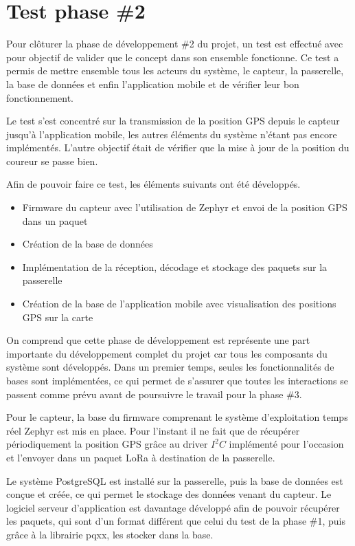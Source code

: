
\chapter{Test phase \#2}\label{ch:test_2}

Pour clôturer la phase de développement \#2 du projet, un test est effectué avec pour objectif de valider que le concept dans son ensemble fonctionne. Ce test a permis de mettre ensemble tous les acteurs du système, le capteur, la passerelle, la base de données et enfin l'application mobile et de vérifier leur bon fonctionnement.

Le test s'est concentré sur la transmission de la position GPS depuis le capteur jusqu'à l'application mobile, les autres éléments du système n'étant pas encore implémentés. L’autre objectif était de vérifier que la mise à jour de la position du coureur se passe bien.

Afin de pouvoir faire ce test, les éléments suivants ont été développés.

\begin{itemize}
\item Firmware du capteur avec l'utilisation de Zephyr et envoi de la position GPS dans un paquet
\item Création de la base de données
\item Implémentation de la réception, décodage et stockage des paquets sur la passerelle
\item Création de la base de l'application mobile avec visualisation des positions GPS sur la carte
\end{itemize}

On comprend que cette phase de développement est représente une part importante du développement complet du projet car tous les composants du système sont développés. Dans un premier temps, seules les fonctionnalités de bases sont implémentées, ce qui permet de s'assurer que toutes les interactions se passent comme prévu avant de poursuivre le travail pour la phase \#3.

Pour le capteur, la base du firmware comprenant le système d'exploitation temps réel Zephyr est mis en place. Pour l'instant il ne fait que de récupérer périodiquement la position GPS grâce au driver $I^{2}C$ implémenté pour l'occasion et l'envoyer dans un paquet LoRa à destination de la passerelle.

Le système PostgreSQL est installé sur la passerelle, puis la base de données est conçue et créée, ce qui permet le stockage des données venant du capteur. Le logiciel serveur d'application est davantage développé afin de pouvoir récupérer les paquets, qui sont d'un format différent que celui du test de la phase \#1, puis grâce à la librairie pqxx, les stocker dans la base.

